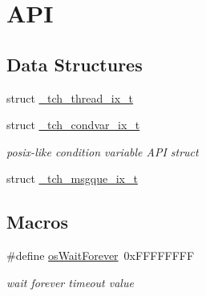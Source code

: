 \hypertarget{group___a_p_i}{\section{A\+P\+I}
\label{group___a_p_i}
}
\subsection*{Data Structures}
\begin{DoxyCompactItemize}
\item 
struct \hyperlink{struct__tch__thread__ix__t}{\+\_\+tch\+\_\+thread\+\_\+ix\+\_\+t}
\item 
struct \hyperlink{struct__tch__condvar__ix__t}{\+\_\+tch\+\_\+condvar\+\_\+ix\+\_\+t}
\begin{DoxyCompactList}\small\item\em posix-\/like condition variable A\+P\+I struct \end{DoxyCompactList}\item 
struct \hyperlink{struct__tch__msgque__ix__t}{\+\_\+tch\+\_\+msgque\+\_\+ix\+\_\+t}
\end{DoxyCompactItemize}
\subsection*{Macros}
\begin{DoxyCompactItemize}
\item 
\#define \hyperlink{group___a_p_i_ga9eb9a7a797a42e4b55eb171ecc609ddb}{os\+Wait\+Forever}~0x\+F\+F\+F\+F\+F\+F\+F\+F
\begin{DoxyCompactList}\small\item\em wait forever timeout value \end{DoxyCompactList}\end{DoxyCompactItemize}

